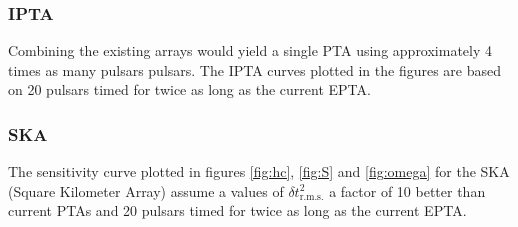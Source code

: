 \subsubsection{IPTA}
Combining the existing arrays would yield a single PTA using approximately 4 times as many pulsars pulsars. The IPTA curves plotted in the figures are based on 20 pulsars timed for twice as long as the current EPTA.

\subsubsection{SKA}
The sensitivity curve plotted in figures \ref{fig:hc}, \ref{fig:S} and \ref{fig:omega} for the SKA (Square Kilometer Array) assume a values of $\delta t^{2}_{\textrm{r.m.s.}}$ a factor of 10 better than current PTAs and 20 pulsars timed for twice as long as the current EPTA.

